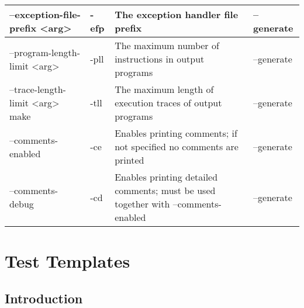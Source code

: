 \documentclass[oneside,final,14pt]{extreport}
\begin{document}
\begin{tabular}{ | p{4cm} | p{1cm} | p{5cm} | p{3cm} |}
  --exception-file-prefix <arg> & -efp & The exception handler file prefix & --generate \\ \hline
  --program-length-limit <arg> & -pll & The maximum number of instructions in output programs & --generate \\ \hline
  --trace-length-limit <arg> make& -tll & The maximum length of execution traces of output programs & --generate \\ \hline
  --comments-enabled & -ce & Enables printing comments; if not specified no comments are printed & --generate \\ \hline
  --comments-debug & -cd & Enables printing detailed comments; must be used together with --comments-enabled  & --generate \\ \hline
\end{tabular}


\chapter{Test Templates}


\section{Introduction}
\end{document}
